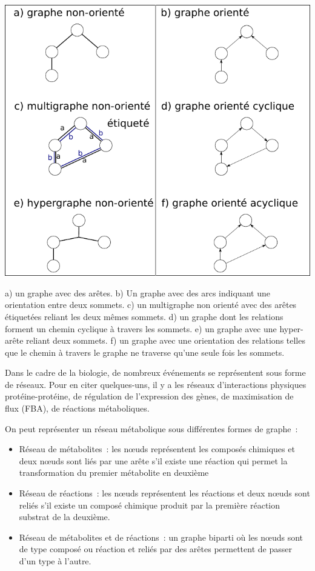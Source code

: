 \begin{refsegment}
    
    \begin{shadedfigure}[H]
    	\centering
    	\includegraphics[width=\textwidth]{img/graph.pdf}
    	\caption{a) un graphe  avec des arêtes. b) Un graphe avec des arcs indiquant une orientation entre deux sommets. c) un multigraphe non orienté avec des arêtes étiquetées reliant les deux mêmes sommets. d) un graphe dont les relations forment un chemin cyclique à travers les sommets. e) un graphe avec une hyper-arête reliant deux sommets. f) un graphe avec une orientation des relations telles que le chemin à travers le graphe ne traverse qu'une seule fois les sommets. }
    	\label{fig:graphe}
    \end{shadedfigure}
    
    
    
    Dans le cadre de la biologie, de nombreux événements se représentent sous forme de réseaux. Pour en citer quelques-uns, il y a les réseaux d'interactions physiques protéine-protéine, de régulation de l'expression des gènes, de maximisation de flux (\acrfull{FBA}), de réactions métaboliques. 
    
    On peut représenter un réseau métabolique sous différentes formes de graphe :
    \begin{itemize}
    	\item Réseau de métabolites : les nœuds représentent les composés chimiques et deux nœuds sont liés par une arête s'il existe une réaction qui permet la transformation du premier métabolite en deuxième
    	\item Réseau de réactions : les nœuds représentent les réactions et deux nœuds sont reliés s’il existe un composé chimique produit par la première réaction substrat de la deuxième.
    	\item Réseau de métabolites et de réactions : un graphe biparti où les nœuds sont de type composé ou réaction et reliés par des arêtes permettent de passer d’un type à l’autre.
    	

\end{itemize}
\end{refsegment}
